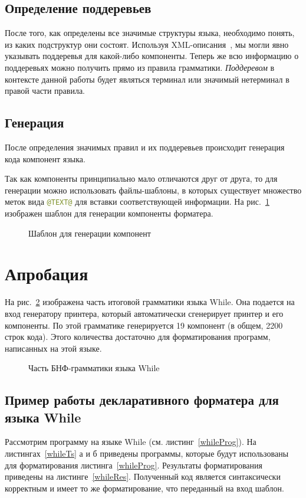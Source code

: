 \documentclass[conference]{IEEEtran}
\begin{document}
\subsection{Определение поддеревьев}
После того, как определены все значимые структуры языка, необходимо понять, из каких подструктур они состоят.
Используя XML-описания~\cite{while}, мы могли явно указывать поддеревья для какой-либо компоненты.
Теперь же всю информацию о поддеревьях можно получить прямо из правила грамматики.
\emph{Поддеревом} в контексте данной работы будет являться терминал или значимый нетерминал в правой части правила.

\subsection{Генерация}
После определения значимых правил и их поддеревьев происходит генерация кода компонент языка.

Так как компоненты принципиально мало отличаются друг от друга, то для генерации можно использовать файлы-шаблоны, в которых существует множество меток вида \lstinline[language=java]{@TEXT@} для вставки соответствующей информации.
На рис.~\ref{component} изображен шаблон для генерации компоненты форматера.
\begin{figure}[h]
	\centering
	
	\caption{Шаблон для генерации компонент}
	\label{component}
\end{figure}

\section{Апробация}
На рис.~\ref{whileBnf} изображена часть итоговой грамматики языка While.
Она подается на вход генератору принтера, который автоматически сгенерирует принтер и его компоненты.
По этой грамматике генерируется 19 компонент (в общем, 2200 строк кода).
Этого количества достаточно для форматирования программ, написанных на этой языке.

\begin{figure}[h]
	\centering
	
	\caption{Часть БНФ-грамматики языка While}
	\label{whileBnf}
\end{figure}

\subsection{Пример работы декларативного форматера для языка While}
Рассмотрим программу на языке While (см. листинг~\ref{whileProg}).
На листингах~\ref{whileTs} а и б приведены программы, которые будут использованы для форматирования листинга~\ref{whileProg}.
Результаты форматирования приведены на листинге~\ref{whileRes}.
Полученный код является синтаксически корректным и имеет то же форматирование, что переданный на вход шаблон.
\end{document}
